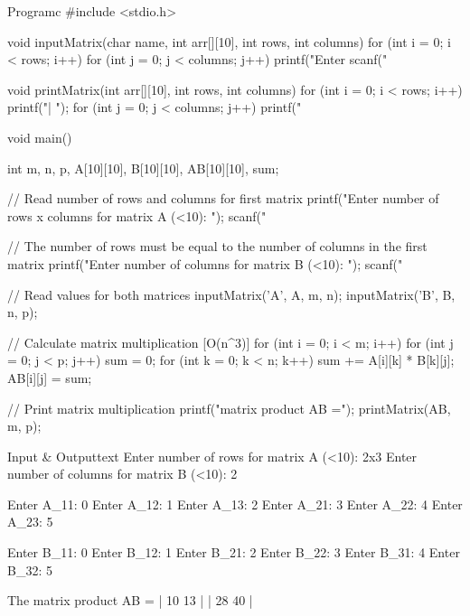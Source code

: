 \documentclass[11pt]{ipu-c}
\begin{document}
    \newpage
    \begin{code}
        {Program}{c}
#include <stdio.h>

void inputMatrix(char name, int arr[][10], int rows, int columns) {
    for (int i = 0; i < rows; i++) {
        for (int j = 0; j < columns; j++) {
            printf("Enter %
            scanf("%
        }
    }
}

void printMatrix(int arr[][10], int rows, int columns) {
    for (int i = 0; i < rows; i++) {
        printf("| ");
        for (int j = 0; j < columns; j++) {
            printf("%
        }
    }
}

void main() {
    int m, n, p, A[10][10], B[10][10], AB[10][10], sum;

    // Read number of rows and columns for first matrix
    printf("Enter number of rows x columns for matrix A (<10): ");
    scanf("%

    // The number of rows must be equal to the number of columns in the first matrix
    printf("Enter number of columns for matrix B (<10): ");
    scanf("%

    // Read values for both matrices
    inputMatrix('A', A, m, n); inputMatrix('B', B, n, p);

    // Calculate matrix multiplication [O(n^3)]
    for (int i = 0; i < m; i++) {
        for (int j = 0; j < p; j++) {
            sum = 0;
            for (int k = 0; k < n; k++) {sum += A[i][k] * B[k][j];}
            AB[i][j] = sum;
        }
    }

    // Print matrix multiplication
    printf("\nThe matrix product AB =");
    printMatrix(AB, m, p);
}
    \end{code}
    \begin{code}
        {Input \& Output}{text}
Enter number of rows for matrix A (<10): 2x3
Enter number of columns for matrix B (<10): 2

Enter A_11: 0
Enter A_12: 1
Enter A_13: 2
Enter A_21: 3
Enter A_22: 4
Enter A_23: 5

Enter B_11: 0
Enter B_12: 1
Enter B_21: 2
Enter B_22: 3
Enter B_31: 4
Enter B_32: 5

The matrix product AB =
| 10 13 |
| 28 40 |
    \end{code}

\end{document}
